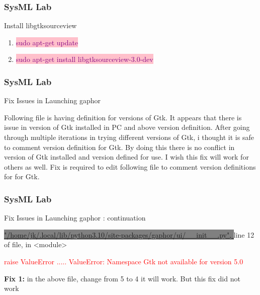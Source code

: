 \newpage
\begin{frame}
\frametitle{SysML Lab}
\begin{block}{ Install libgtksourceview }
\begin{enumerate} 
\item    \colorbox{pink}{ \textcolor{purple}{sudo apt-get update  } }
\item    \colorbox{pink}{ \textcolor{purple}{sudo apt-get install libgtksourceview-3.0-dev  } }
\end{enumerate}
\end{block}
\end{frame}


\newpage
\begin{frame}
\frametitle{SysML Lab}
\begin{block}{Fix Issues in Launching gaphor }

Following file is having definition for versions of Gtk.  It appears that there is issue in version of Gtk installed in PC and above version definition.  After going through multiple iterations in trying different versions of Gtk, i thought it is safe to comment version definition for Gtk.   By doing this there is no conflict in version of Gtk installed and version defined for use.   I wish this fix will work for others as well.  Fix is required to edit following file  to comment version definitions for for Gtk.

\end{block}
\end{frame}

\newpage
\begin{frame}
\frametitle{SysML Lab}
\begin{block}{Fix Issues in Launching gaphor : continuation }

  \colorbox{gray}{ \textcolor{white} 
 { { \scriptsize \url{"/home/jk/.local/lib/python3.10/site-packages/gaphor/ui/__init__.py", }  }   } }   line 12 of file, in <module>



\textcolor{red}{raise ValueError ..... ValueError: Namespace Gtk not available for version 5.0  }

{\bf Fix 1:  } 
in the above file,   change from 5 to 4 it will work.  But this fix did not work

\end{block}
\end{frame}


